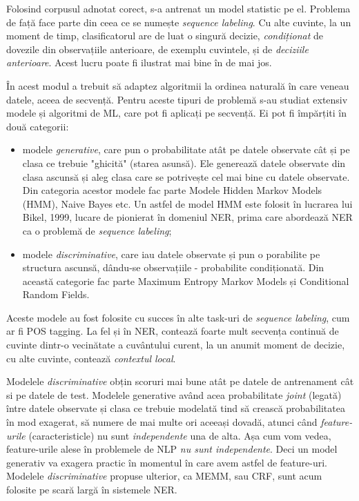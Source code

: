 Folosind corpusul adnotat corect, s-a antrenat un model statistic pe el. Problema de față face parte din ceea ce se numește \textit{sequence labeling}. Cu alte cuvinte, la un moment de timp, clasificatorul are de luat o singură decizie, \textit{condiționat} de dovezile din observațiile anterioare, de exemplu cuvintele, și de \textit{deciziile anterioare}. Acest lucru poate fi ilustrat mai bine în  de mai jos. 



În acest modul a trebuit să adaptez algoritmii la ordinea naturală în care veneau datele, aceea de secvență. Pentru aceste tipuri de problemă s-au studiat extensiv modele și algoritmi de ML, care pot fi aplicați pe secvență. Ei pot fi împărțiti în două categorii:

\begin{itemize}
\item modele \textit{generative}, care pun o probabilitate atât pe datele observate cât și pe clasa ce trebuie "ghicită" (starea asunsă). Ele generează datele observate din clasa ascunsă și aleg clasa care se potrivește cel mai bine cu datele observate. Din categoria acestor modele fac parte Modele Hidden Markov Models (HMM), Naive Bayes etc. Un astfel de model HMM este folosit în lucrarea lui Bikel, 1999, lucare de pionierat în domeniul NER, prima care abordează NER ca o problemă de \textit{sequence labeling}\cite{Bikel99analgorithm};
\item modele \textit{discriminative}, care iau datele observate și pun o porabilite pe structura ascunsă, dându-se observațiile - probabilite condiționată. Din această categorie fac parte Maximum Entropy Markov Models și Conditional Random Fields.\cite{Mccallum00maximumentropy}\cite{Lafferty01conditionalrandom}
\end{itemize}

Aceste modele au fost folosite cu succes în alte task-uri de \textit{sequence labeling}, cum ar fi POS tagging. La fel și în NER, contează foarte mult secvența continuă de cuvinte dintr-o vecinătate a cuvântului curent, la un anumit moment de decizie, cu alte cuvinte, contează \textit{contextul local}.

Modelele \textit{discriminative} obțin scoruri mai bune atât pe datele de antrenament cât si pe datele de test. Modelele generative având acea probabilitate \textit{joint} (legată) între datele observate și clasa ce trebuie modelată tind să crească probabilitatea în mod exagerat, să numere de mai multe ori aceeași dovadă, atunci când \textit{feature-urile} (caracteristicle) nu sunt \textit{independente} una de alta. Așa cum vom vedea, feature-urile alese în problemele de NLP \textit{nu sunt independente}. Deci un model generativ va exagera practic în momentul în care avem astfel de feature-uri. Modelele \textit{discriminative} propuse ulterior, ca MEMM, sau CRF, sunt acum folosite pe scară largă în sistemele NER.

